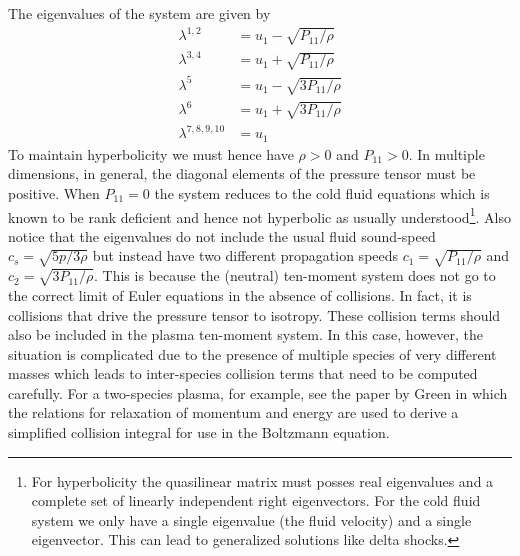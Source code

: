 \documentclass[11pt, reqno]{amsart}
\theoremstyle{definition}
\begin{document}
The eigenvalues of the system are given by
\begin{align}
  \lambda^{1,2} &= u_1-\sqrt{P_{11}/\rho} \\
  \lambda^{3,4} &= u_1+\sqrt{P_{11}/\rho} \\
  \lambda^{5}   &= u_1-\sqrt{3P_{11}/\rho} \\
  \lambda^{6}   &= u_1+\sqrt{3P_{11}/\rho} \\
  \lambda^{7,8,9,10}    &= u_1
\end{align}
To maintain hyperbolicity we must hence have $\rho>0$ and
$P_{11}>0$. In multiple dimensions, in general, the diagonal elements
of the pressure tensor must be positive. When $P_{11}=0$ the system
reduces to the cold fluid equations which is known to be rank
deficient and hence not hyperbolic as usually understood\footnote{For
  hyperbolicity the quasilinear matrix must posses real eigenvalues
  and a complete set of linearly independent right eigenvectors. For
  the cold fluid system we only have a single eigenvalue (the fluid
  velocity) and a single eigenvector. This can lead to generalized
  solutions like delta shocks.}. Also notice that the eigenvalues do
not include the usual fluid sound-speed $c_s=\sqrt{5p/3\rho}$ but
instead have two different propagation speeds $c_1=\sqrt{P_{11}/\rho}$
and $c_2=\sqrt{3P_{11}/\rho}$. This is because the (neutral)
ten-moment system does not go to the correct limit of Euler equations
in the absence of collisions. In fact, it is collisions that drive the
pressure tensor to isotropy. These collision terms should also be
included in the plasma ten-moment system. In this case, however, the
situation is complicated due to the presence of multiple species of
very different masses which leads to inter-species collision terms
that need to be computed carefully. For a two-species plasma, for
example, see the paper by Green\cite{Green1973} in which the relations
for relaxation of momentum and energy are used to derive a simplified
collision integral for use in the Boltzmann equation.
\end{document}
